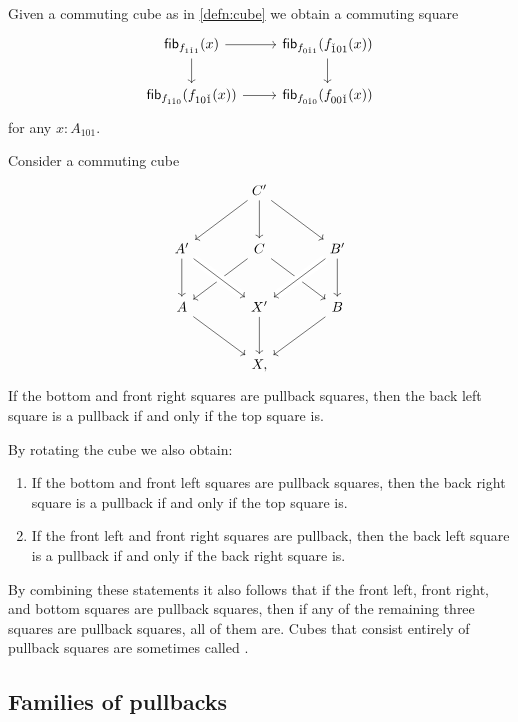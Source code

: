 \begin{lem}
Given a commuting cube as in \cref{defn:cube} we obtain a commuting square
\begin{equation*}
\begin{tikzcd}
\fib{f_{1\check{1}1}}{x} \arrow[r] \arrow[d] & \fib{f_{0\check{1}1}}{f_{\check{1}01}(x)} \arrow[d] \\
\fib{f_{1\check{1}0}}{f_{10\check{1}}(x)} \arrow[r] & \fib{f_{0\check{1}0}}{f_{00\check{1}}(x)}
\end{tikzcd}
\end{equation*}
for any $x:A_{101}$. 
\end{lem}

\begin{lem}
Consider a commuting cube
\begin{equation*}
\begin{tikzcd}[column sep=large,row sep=large]
& C' \arrow[dl] \arrow[dr] \arrow[d] \\
A' \arrow[d] & C \arrow[dl] \arrow[dr] & B' \arrow[dl,crossing over] \arrow[d] \\
A \arrow[dr] & X' \arrow[d] \arrow[from=ul,crossing over] & B \arrow[dl] \\
& X,
\end{tikzcd}
\end{equation*}
If the bottom and front right squares are pullback squares, then the back left square is a pullback if and only if the top square is.
\end{lem}

\begin{rmk}
By rotating the cube we also obtain:
\begin{enumerate}
\item If the bottom and front left squares are pullback squares, then the back right square is a pullback if and only if the top square is.
\item If the front left and front right squares are pullback, then the back left square is a pullback if and only if the back right square is.
\end{enumerate}
By combining these statements it also follows that if the front left, front right, and bottom squares are pullback squares, then if any of the remaining three squares are pullback squares, all of them are. Cubes that consist entirely of pullback squares are sometimes called .
\end{rmk}

\subsection{Families of pullbacks}

